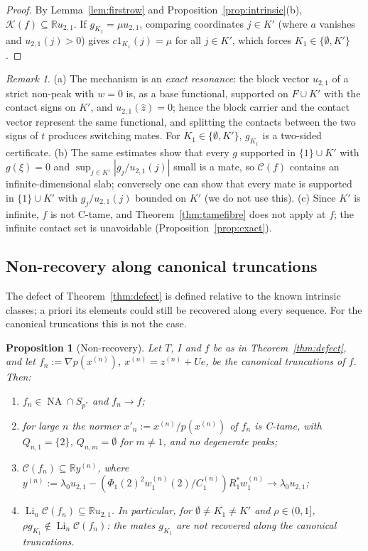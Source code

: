 \documentclass[10pt]{amsart}
\newtheorem{proposition}[theorem]{Proposition}
\theoremstyle{definition}
\theoremstyle{remark}
\newtheorem{remark}[theorem]{Remark}
\newcommand{\NA}{\operatorname{NA}}
\newcommand{\R}{\mathbb R}
\newcommand{\Cset}{\mathcal C}
\newcommand{\Li}{\operatorname*{Li}}
\newcommand{\zh}{\hat z}
\begin{document}
\begin{proof}
By Lemma~\ref{lem:firstrow} and Proposition~\ref{prop:intrinsic}(b),
$\mathcal K(f)\subseteq\R u_{2,1}$.  If $g_{K_1}=\mu u_{2,1}$, comparing
coordinates $j\in K'$ (where $a$ vanishes and $u_{2,1}(j)>0$) gives
$c1_{K_1}(j)=\mu$ for all $j\in K'$, which forces $K_1\in\{\emptyset,K'\}$.
\end{proof}

\begin{remark}\label{rem:twopiece}
(a) The mechanism is an \emph{exact resonance}: the block vector $u_{2,1}$
of a strict non-peak with $w=0$ is, as a base functional, supported on
$F\cup K'$ with the contact signs on $K'$, and $u_{2,1}(\zh)=0$; hence the
block carrier and the contact vector represent the same functional, and
splitting the contacts between the two signs of $t$ produces switching
mates.  For $K_1\in\{\emptyset,K'\}$, $g_{K_1}$ is a two-sided certificate.
(b) The same estimates show that every $g$ supported in $\{1\}\cup K'$ with
$g(\xi)=0$ and $\sup_{j\in K'}|g_j/u_{2,1}(j)|$ small is a mate, so
$\Cset(f)$ contains an infinite-dimensional slab; conversely one can show
that every mate is supported in $\{1\}\cup K'$ with $g_j/u_{2,1}(j)$
bounded on $K'$ (we do not use this).  (c) Since $K'$ is infinite, $f$ is
not C-tame, and Theorem~\ref{thm:tamefibre} does not apply at $f$; the
infinite contact set is unavoidable (Proposition~\ref{prop:exact}).
\end{remark}

\subsection{Non-recovery along canonical truncations}
The defect of Theorem~\ref{thm:defect} is defined relative to the known
intrinsic classes; a priori its elements could still be recovered along
every sequence.  For the canonical truncations this is not the case.

\begin{proposition}[Non-recovery]\label{prop:nonrecovery}
Let $T$, $I$ and $f$ be as in Theorem~\ref{thm:defect}, and let
$f_n:=\nabla p(x^{(n)})$, $x^{(n)}=z^{(n)}+Ue$, be the canonical truncations
of $f$.  Then:
\begin{enumerate}
\item[(a)] $f_n\in\NA\cap S_{p^*}$ and $f_n\to f$;
\item[(b)] for large $n$ the normer $x'_n:=x^{(n)}/p(x^{(n)})$ of $f_n$ is
C-tame, with $Q_{n,1}=\{2\}$, $Q_{n,m}=\emptyset$ for $m\ne1$, and no
degenerate peaks;
\item[(c)] $\Cset(f_n)\subseteq\R y^{(n)}$, where
$y^{(n)}:=\lambda_0u_{2,1}-(\Phi_1(2)^2w^{(n)}_1(2)/C^{(n)}_1)R_1^*w^{(n)}_1
\to\lambda_0u_{2,1}$;
\item[(d)] $\Li_n\Cset(f_n)\subseteq\R u_{2,1}$.  In particular, for
$\emptyset\ne K_1\ne K'$ and $\rho\in(0,1]$, $\rho g_{K_1}\notin
\Li_n\Cset(f_n)$: the mates $g_{K_1}$ are not recovered along the canonical
truncations.
\end{enumerate}
\end{proposition}
\end{document}
